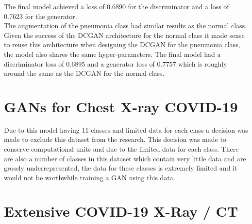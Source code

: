 The final model achieved a loss of 0.6890 for the discriminator and a loss of 0.7623 for the generator.
\\
The augmentation of the pneumonia class had similar results as the normal class.  Given the success of the DCGAN architecture for the normal class it made sense to reuse this architecture when designing the DCGAN for the pneumonia class, the model also shares the same hyper-parameters.  The final model had a discriminator loss of 0.6895 and a generator loss of 0.7757 which is roughly around the same as the DCGAN for the normal class.
\section{GANs for Chest X-ray COVID-19}
Due to this model having 11 classes and limited data for each class a decision was made to exclude this dataset from the research.  This decision was made to conserve computational units and due to the limited data for each class.  There are also a number of classes in this dataset which contain very little data and are grossly underrepresented, the data for these classes is extremely limited and it would not be worthwhile training a GAN using this data.
\section{Extensive COVID-19 X-Ray / CT}
